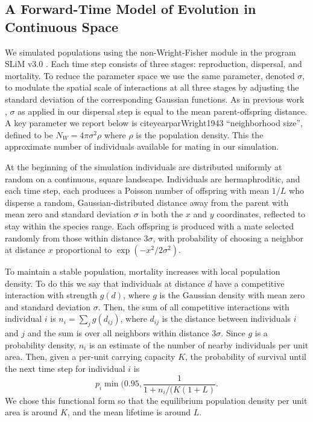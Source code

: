 \documentclass[11pt,twoside,lineno]{preprint}
\begin{document}
\subsection{A Forward-Time Model of Evolution in Continuous Space}

We simulated populations using the non-Wright-Fisher module in the program SLiM v3.0 \citep{Haller2019}. 
Each time step consists of three stages: reproduction, dispersal, and mortality. 
To reduce the parameter space we use the same parameter, denoted $\sigma$, 
to modulate the spatial scale of interactions at all three stages by adjusting the standard deviation of the corresponding Gaussian functions. 
As in previous work \citep{Wright1943,Ringbauer2017}, $\sigma$ as applied in our dispersal step is equal to the mean parent-offspring distance.  
A key parameter we report below is
\citeauthor{Wright1943} citeyearpar{Wright1943} ``neighborhood size'', 
defined to be $N_W = 4\pi\sigma^2 \rho$ where $\rho$ is the population density.
This the approximate number of individuals available for mating in our simulation. 

At the beginning of the simulation individuals are distributed uniformly at random on a continuous, square landscape. 
Individuals are hermaphroditic, and each time step, each produces a Poisson number of offspring with mean $1/L$ 
who disperse a random, Gaussian-distributed distance away from the parent with mean zero and standard deviation $\sigma$
in both the $x$ and $y$ coordinates, reflected to stay within the species range.
Each offspring is produced with a mate selected randomly from those within distance $3 \sigma$,
with probability of choosing a neighbor at distance $x$ proportional to $\exp(-x^2 / 2 \sigma^2)$.

To maintain a stable population, mortality increases with local population density.
To do this we say that individuals at distance $d$ have a competitive interaction with strength $g(d)$,
where $g$ is the Gaussian density with mean zero and standard deviation $\sigma$.
Then, the sum of all competitive interactions with individual $i$ is $n_i = \sum_j g(d_{ij})$,
where $d_{ij}$ is the distance between individuals $i$ and $j$ and the sum is over all neighbors within distance $3 \sigma$.
Since $g$ is a probability density, $n_i$ is an estimate of the number of nearby individuals per unit area.
Then, given a per-unit carrying capacity $K$, the probability of survival until the next time step for individual $i$ is
\begin{equation}
    p_i \min(0.95, \frac{1}{1 + n_i / (K (1+L)} .
\end{equation}
We chose this functional form so that the equilibrium population density per unit area is around $K$,
and the mean lifetime is around $L$.
\end{document}
